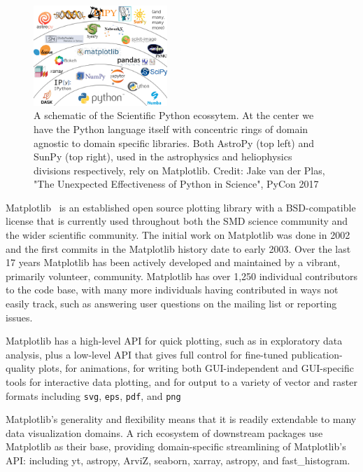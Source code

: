 \documentclass[12pt]{article}
\numberwithin{page}{section}
\begin{document}
\begin{figure}
  \includegraphics[width=0.45\textwidth]{scipy-ecosystem}
  \caption{A schematic of the Scientific Python ecossytem.  At the
    center we have the Python language itself with concentric rings of
    domain agnostic to domain specific libraries.  Both AstroPy (top
    left) and SunPy (top right), used in the astrophysics and
    heliophysics divisions respectively, rely on Matplotlib.
    Credit: Jake van der Plas, "The Unexpected Effectiveness of Python
    in Science", PyCon 2017}
  \label{fig:ecosystem}
\end{figure}



Matplotlib~\cite{Hunter:2007} is an established open source plotting
library with a BSD-compatible license that is currently used
throughout both the SMD science community and the wider scientific
community.  The initial work on Matplotlib was done in 2002 and the
first commits in the Matplotlib history date to early 2003.  Over the
last 17 years Matplotlib has been actively developed and maintained by
a vibrant, primarily volunteer, community.  Matplotlib has over 1,250
individual contributors to the code base, with many more individuals
having contributed in ways not easily track, such as answering user
questions on the mailing list or reporting issues.

Matplotlib has a high-level API for quick plotting, such as in
exploratory data analysis, plus a low-level API that gives full control for
fine-tuned publication-quality plots, for animations, for writing both
GUI-independent and GUI-specific tools for interactive data plotting, and
for output to a variety of vector and raster
formats including \texttt{svg}, \texttt{eps},
\texttt{pdf}, and \texttt{png}

Matplotlib's generality and flexibility means that it is readily extendable to
many data visualization domains.  A rich ecosystem of downstream packages use
Matplotlib as their base, providing domain-specific streamlining of
Matplotlib's API: including yt, astropy, ArviZ, seaborn, xarray, astropy, and
fast\_histogram.
\end{document}
